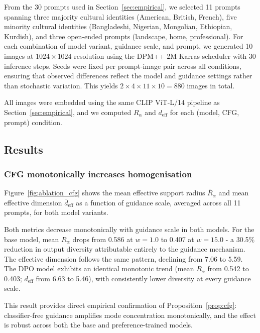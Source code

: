 \documentclass[11pt]{article}
\begin{document}
From the 30 prompts used in Section~\ref{sec:empirical}, we selected 11 prompts spanning three majority cultural identities (American, British, French), five minority cultural identities (Bangladeshi, Nigerian, Mongolian, Ethiopian, Kurdish), and three open-ended prompts (landscape, home, professional). For each combination of model variant, guidance scale, and prompt, we generated 10 images at $1024 \times 1024$ resolution using the DPM++ 2M Karras scheduler with 30 inference steps. Seeds were fixed per prompt-image pair across all conditions, ensuring that observed differences reflect the model and guidance settings rather than stochastic variation. This yields $2 \times 4 \times 11 \times 10 = 880$ images in total.

All images were embedded using the same CLIP ViT-L/14 pipeline as Section~\ref{sec:empirical}, and we computed $R_\alpha$ and $d_{\mathrm{eff}}$ for each (model, CFG, prompt) condition.

\subsection{Results}\label{sec:ablation_results}

\subsubsection{CFG monotonically increases homogenisation}

Figure~\ref{fig:ablation_cfg} shows the mean effective support radius $\bar{R}_\alpha$ and mean effective dimension $\bar{d}_{\mathrm{eff}}$ as a function of guidance scale, averaged across all 11 prompts, for both model variants.

Both metrics decrease monotonically with guidance scale in both models. For the base model, mean $R_\alpha$ drops from 0.586 at $w = 1.0$ to 0.407 at $w = 15.0$ - a 30.5\% reduction in output diversity attributable entirely to the guidance mechanism. The effective dimension follows the same pattern, declining from 7.06 to 5.59. The DPO model exhibits an identical monotonic trend (mean $R_\alpha$ from 0.542 to 0.403; $d_{\mathrm{eff}}$ from 6.63 to 5.46), with consistently lower diversity at every guidance scale.

This result provides direct empirical confirmation of Proposition~\ref{prop:cfg}: classifier-free guidance amplifies mode concentration monotonically, and the effect is robust across both the base and preference-trained models.
\end{document}
